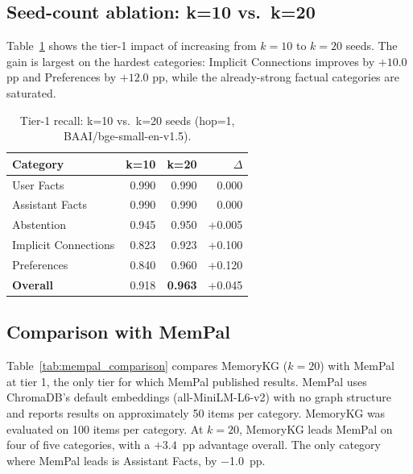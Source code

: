 \documentclass[11pt,a4paper]{article}
\begin{document}
\subsection{Seed-count ablation: k=10 vs.\ k=20}

Table~\ref{tab:seed_ablation} shows the tier-1 impact of increasing from $k{=}10$ to
$k{=}20$ seeds.
The gain is largest on the hardest categories: Implicit Connections improves by
$+10.0$ pp and Preferences by $+12.0$ pp, while the already-strong factual categories
are saturated.

\begin{table}[ht]
\centering
\caption{Tier-1 recall: k=10 vs.\ k=20 seeds (hop=1, BAAI/bge-small-en-v1.5).}
\label{tab:seed_ablation}
\begin{tabular}{lrrr}
  \toprule
  \textbf{Category} & \textbf{k=10} & \textbf{k=20} & \textbf{$\Delta$} \\
  \midrule
  User Facts             & 0.990 & 0.990 & 0.000 \\
  Assistant Facts        & 0.990 & 0.990 & 0.000 \\
  Abstention             & 0.945 & 0.950 & +0.005 \\
  Implicit Connections   & 0.823 & 0.923 & +0.100 \\
  Preferences            & 0.840 & 0.960 & +0.120 \\
  \midrule
  \textbf{Overall}       & 0.918 & \textbf{0.963} & +0.045 \\
  \bottomrule
\end{tabular}
\end{table}

\subsection{Comparison with MemPal}

Table~\ref{tab:mempal_comparison} compares MemoryKG ($k{=}20$) with
MemPal~\citep{mempal2026} at tier 1, the only tier for which MemPal published results.
MemPal uses ChromaDB's default embeddings (all-MiniLM-L6-v2) with no graph structure
and reports results on approximately 50 items per category.
MemoryKG was evaluated on 100 items per category.
At $k{=}20$, MemoryKG leads MemPal on four of five categories, with a $+3.4$~pp
advantage overall.
The only category where MemPal leads is Assistant Facts, by $-$1.0~pp.
\end{document}
